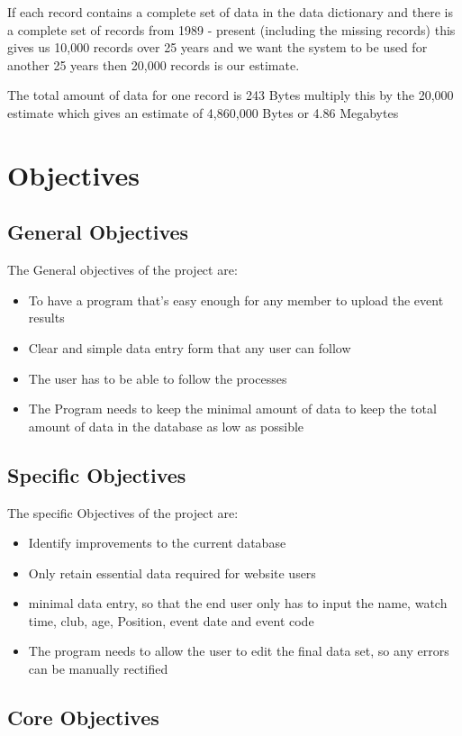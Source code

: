 If each record  contains a complete set of data in the data dictionary and there is a complete set of records from 1989 - present (including the missing records) this gives us 10,000 records over 25 years and we want the system to be used for another 25 years then 20,000 records is our estimate. 
 
The total amount of data for one record is 243 Bytes multiply this by the 20,000 estimate which gives an estimate of 4,860,000 Bytes or 4.86 Megabytes
\section{Objectives}

\subsection{General Objectives}
The General objectives of the project are:
\begin{itemize}
	\item To have a program that's easy enough for any member to upload the event results
	\item Clear and simple data entry form that any user can follow
	\item The user has to be able to follow the processes
	\item The Program needs to keep the minimal amount of data to keep the total amount of data in the database as low as possible
\end{itemize}

\subsection{Specific Objectives}
The specific Objectives of the project are:
\begin{itemize}
	\item Identify improvements to the current database
	\item Only retain essential data required for website users
	\item minimal data entry, so that the end user only has to input the name, watch time, club, age, Position, event date and event code
	\item The program needs to allow the user to edit the final data set, so any errors can be manually rectified
\end{itemize}

\subsection{Core Objectives}

